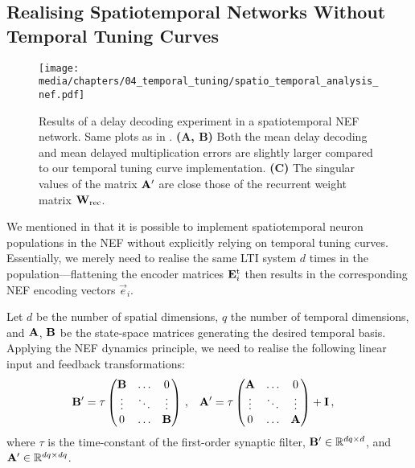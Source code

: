 \subsection{Realising Spatiotemporal Networks Without Temporal Tuning Curves}
\label{app:spatiotemporal_nef}

\begin{figure}[b]
	\centering
	\texttt{[image: media/chapters/04\_temporal\_tuning/spatio\_temporal\_analysis\_nef.pdf]}
	\caption[Results of a delay decoding experiment in a spatiotemporal NEF network]{Results of a delay decoding experiment in a spatiotemporal NEF network. Same plots as in .
	\textbf{(A, B)} Both the mean delay decoding and mean delayed multiplication errors are slightly larger compared to our temporal tuning curve implementation.
	\textbf{(C)} The singular values of the matrix $\mathbf{A}'$ are close those of the recurrent weight matrix $\mathbf{W}_\mathrm{rec}$.
	}
	\label{fig:spatio_temporal_analysis_nef}
\end{figure}

We mentioned in  that it is possible to implement spatiotemporal neuron populations in the NEF without explicitly relying on temporal tuning curves.
Essentially, we merely need to realise the same LTI system $d$ times in the population---flattening the encoder matrices $\mathbf{E}^\mathrm{t}_i$ then results in the corresponding NEF encoding vectors $\vec e_i$.

Let $d$ be the number of spatial dimensions, $q$ the number of temporal dimensions, and $\mathbf{A}$, $\mathbf{B}$ be the state-space matrices generating the desired temporal basis.
Applying the NEF dynamics principle, we need to realise the following linear input and feedback transformations:
\begin{align*}
	\mathbf{B}' &= \tau \begin{pmatrix}
		\mathbf{B} & \hdots & 0 \\
		\vdots & \ddots & \vdots \\
		0 & \hdots & \mathbf{B}
	\end{pmatrix} \,, &
	\mathbf{A}' &= \tau \begin{pmatrix}
		\mathbf{A} & \hdots & 0 \\
		\vdots & \ddots & \vdots \\
		0 & \hdots & \mathbf{A}
	\end{pmatrix} + \mathbf{I} \,,
\end{align*}
where $\tau$ is the time-constant of the first-order synaptic filter, $\mathbf{B}' \in \mathbb{R}^{dq \times d}$, and $\mathbf{A}' \in \mathbb{R}^{dq \times dq}$.


